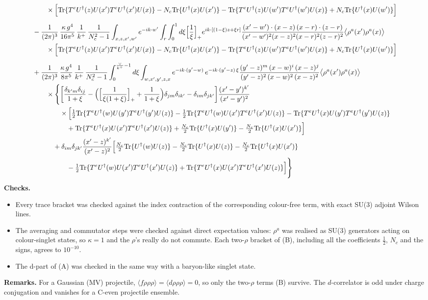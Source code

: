 \documentclass[10pt]{article}
\begin{document}
\begin{align}
&\qquad\times\Big[{\rm Tr}\{T^{e}U^{\dagger}(z)U(x')T^{e}U^{\dagger}(x')U(x)\}-N_{c}{\rm Tr}\{U^{\dagger}(x)U(x')\}-{\rm Tr}\{T^{e}U^{\dagger}(z)U(w')T^{e}U^{\dagger}(w')U(x)\}+N_{c}{\rm Tr}\{U^{\dagger}(x)U(w')\}\Big]\notag\\[6pt]
&-\frac{1}{(2\pi)^{3}}\,\frac{\kappa\,g^{4}}{16\pi^{5}}\,\frac{1}{k^{+}}\,\frac{1}{N_{c}^{2}-1}\int_{x,z,x',w'}e^{-ik\cdot w'}\int_{r}\int_{0}^{1}d\xi\Big[\frac1\xi\Big]_{+}e^{ik\cdot[(1-\xi)z+\xi r]}\frac{(x'-w')\cdot(x-z)\,(x-r)\cdot(z-r)}{(x'-w')^{2}(x-z)^{2}(x-r)^{2}(z-r)^{2}}\big\langle\rho^{a}(x')\rho^{a}(x)\big\rangle\notag\\
&\qquad\times\Big[{\rm Tr}\{T^{e}U^{\dagger}(z)U(x')T^{e}U^{\dagger}(x')U(x)\}-N_{c}{\rm Tr}\{U^{\dagger}(x)U(x')\}-{\rm Tr}\{T^{e}U^{\dagger}(z)U(w')T^{e}U^{\dagger}(w')U(x)\}+N_{c}{\rm Tr}\{U^{\dagger}(x)U(w')\}\Big]\notag\\[6pt]
&+\frac{1}{(2\pi)^{3}}\,\frac{\kappa\,g^{4}}{8\pi^{5}}\,\frac{1}{k^{+}}\,\frac{1}{N_{c}^{2}-1}\int_{0}^{\frac{\vee}{k^{+}}-1}d\xi\int_{w,x',y',z,x}e^{-ik\cdot(y'-w)}\,e^{-ik\cdot(y'-z)\,\xi}\frac{(y'-z)^{m}\,(x-w)^{i}\,(x-z)^{j}}{(y'-z)^{2}\,(x-w)^{2}\,(x-z)^{2}}\big\langle\rho^{a}(x')\rho^{a}(x)\big\rangle\notag\\
&\qquad\times\Bigg\{\bigg[\frac{\delta_{k'm}\delta_{ij}}{1+\xi}-\Big(\Big[\frac{1}{\xi(1+\xi)}\Big]_{+}+\frac{1}{1+\xi}\Big)\delta_{jm}\delta_{ik'}-\delta_{im}\delta_{jk'}\bigg]\frac{(x'-y')^{k'}}{(x'-y')^{2}}\notag\\
&\qquad\qquad\times\Big[\tfrac12{\rm Tr}\{T^{e}U^{\dagger}(w)U(y')T^{e}U^{\dagger}(y')U(z)\}-\tfrac12{\rm Tr}\{T^{e}U^{\dagger}(w)U(x')T^{e}U^{\dagger}(x')U(z)\}-{\rm Tr}\{T^{e}U^{\dagger}(x)U(y')T^{e}U^{\dagger}(y')U(z)\}\notag\\
&\qquad\qquad\quad+{\rm Tr}\{T^{e}U^{\dagger}(x)U(x')T^{e}U^{\dagger}(x')U(z)\}+\tfrac{N_{c}}{2}{\rm Tr}\{U^{\dagger}(x)U(y')\}-\tfrac{N_{c}}{2}{\rm Tr}\{U^{\dagger}(x)U(x')\}\Big]\notag\\
&\qquad\quad+\delta_{im}\delta_{jk'}\frac{(x'-z)^{k'}}{(x'-z)^{2}}\Big[\tfrac{N_{c}}{2}{\rm Tr}\{U^{\dagger}(w)U(z)\}-\tfrac{N_{c}}{2}{\rm Tr}\{U^{\dagger}(x)U(z)\}-\tfrac{N_{c}}{2}{\rm Tr}\{U^{\dagger}(x)U(x')\}\notag\\
&\qquad\qquad\quad-\tfrac12{\rm Tr}\{T^{e}U^{\dagger}(w)U(x')T^{e}U^{\dagger}(x')U(z)\}+{\rm Tr}\{T^{e}U^{\dagger}(x)U(x')T^{e}U^{\dagger}(x')U(z)\}\Big]\Bigg\}
\end{align}
\noindent\textbf{Checks.}
\begin{itemize}
\item Every trace bracket was checked against the index contraction of the corresponding colour-free term, with exact SU(3) adjoint Wilson lines.
\item The averaging and commutator steps were checked against direct expectation values: $\rho^{a}$ was realised as SU(3) generators acting on colour-singlet states, so $\kappa=1$ and the $\rho$'s really do not commute. Each two-$\rho$ bracket of (B), including all the coefficients $\tfrac12$, $N_{c}$ and the signs, agrees to $10^{-10}$.
\item The d-part of (A) was checked in the same way with a baryon-like singlet state.
\end{itemize}
\textbf{Remarks.} For a Gaussian (MV) projectile, $\langle f\rho\rho\rho\rangle=\langle d\rho\rho\rho\rangle=0$, so only the two-$\rho$ terms (B) survive. The $d$-correlator is odd under charge conjugation and vanishes for a C-even projectile ensemble.
\end{document}
